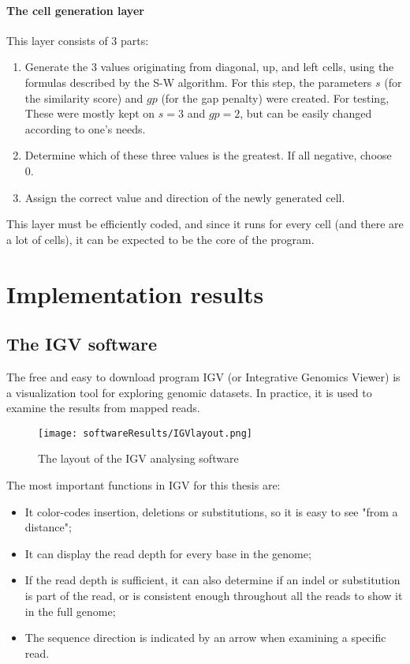 \paragraph{The cell generation layer}
This layer consists of 3 parts:
\begin{enumerate}
	\item Generate the 3 values originating from diagonal, up, and left cells, using the formulas described by the S-W algorithm. For this step, the parameters $s$ (for the similarity score) and $gp$ (for the gap penalty) were created. For testing, These were mostly kept on $s=3$ and $gp=2$, but can be easily changed according to one's needs.
	\item Determine which of these three values is the greatest. If all negative, choose 0.
	\item Assign the correct value and direction of the newly generated cell.
\end{enumerate}

This layer must be efficiently coded, and since it runs for every cell (and there are a lot of cells), it can be expected to be the core of the program.

\section{Implementation results}

\subsection{The IGV software}

The free and easy to download program IGV\cite{12} %
(or Integrative Genomics Viewer) is a visualization tool for exploring genomic datasets. In practice, it is used to examine the results from mapped reads.

\begin{figure}[H]
	\centering
	\texttt{[image: softwareResults/IGVlayout.png]}
	\caption{The layout of the IGV analysing software}
	\label{fig:IGVlayout}
\end{figure}

The most important functions in IGV for this thesis are: 
\begin{itemize}
	\item It color-codes insertion, deletions or substitutions, so it is easy to see "from a distance";
	\item It can display the read depth for every base in the genome;
	\item If the read depth is sufficient, it can also determine if an indel or substitution is part of the read, or is consistent enough throughout all the reads to show it in the full genome;
	\item The sequence direction is indicated by an arrow when examining a specific read.
\end{itemize}

